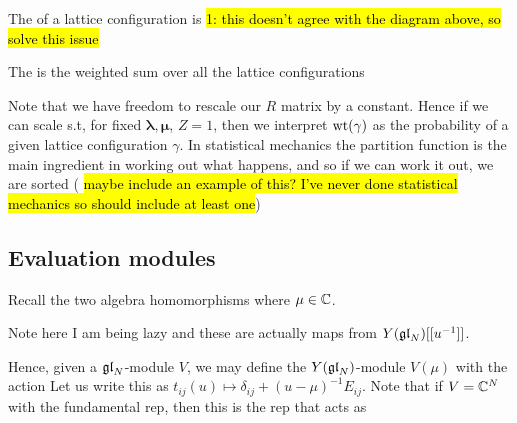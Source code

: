 \documentclass{article}
\begin{document}
\begin{definition}
The  of a lattice configuration is
\hl{1: this doesn't agree with the diagram above, so solve this issue}
\end{definition}

\begin{definition}
The  is the weighted sum over all the lattice configurations 
\end{definition}

\begin{remark}
Note that we have freedom to rescale our $R$ matrix by a constant. Hence if we can scale s.t, for fixed $\bm{\lambda},\bm{\mu}$, $Z=1$, then we interpret $\operatorname{wt}(\gamma)$ as the probability of a given lattice configuration $\gamma$. In statistical mechanics the partition function is the main ingredient in working out what happens, and so if we can work it out, we are sorted (\hl{ maybe include an example of this? I've never done statistical mechanics so should include at least one})
\end{remark}

\subsection{Evaluation modules}

Recall the two algebra homomorphisms 
where $\mu \in \mathbb{C}$.

\begin{remark}
Note here I am being lazy and these are actually maps from $Y(\mathfrak{gl}_N)[[u^{-1}]]$. 
\end{remark}

Hence, given a $\mathfrak{gl}_N$-module $V$,  we may define the $Y(\mathfrak{gl}_N)$-module $V(\mu)$ with the action  
Let us write this as $t_{ij}(u) \mapsto \delta_{ij} + (u - \mu)^{-1}E_{ij}$.
Note that if $V = \mathbb{C}^N$ with the fundamental rep, then this is the rep that acts as 
\end{document}
